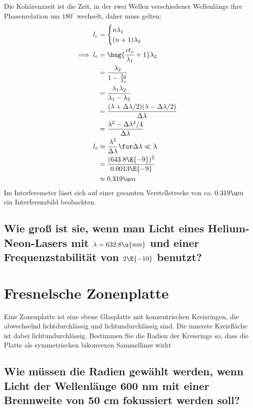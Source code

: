 \documentclass[ex]{exercise}
\begin{document}
\dottedlinett

Die Kohärenzzeit ist die Zeit, in der zwei Wellen verschiedener Wellenlänge ihre 
Phasenrelation um \(180^\circ\) wechselt, daher muss gelten:
\begin{align*}
l_c  &= \begin{cases}
    n \lambda_1\\
    (n+1) \lambda_2\\
\end{cases}\\
\implies l_c &= \hug{\frac{ct_c}{\lambda_1} + 1}\lambda_2\\
 &= \frac{\lambda_2}{1-\frac{\lambda_2}{\lambda_1}}\\
&= \frac{\lambda_1\lambda_2}{\lambda_1-\lambda_2}\\
&= \frac{(\lambda + \Delta\lambda/2)(\lambda - \Delta\lambda/2)}{\Delta\lambda}\\
&= \frac{\lambda^2 - \Delta\lambda^2/4}{\Delta\lambda}\\
l_c &\approx \frac{\lambda^2}{\Delta \lambda}\for \Delta \lambda\ll \lambda\\
 &= \frac{(643.8\E{-9})^2}{0.0013\E{-9}}\\
 &\approx 0.319 \u m
\end{align*}
Im Interferemeter lässt sich auf einer gesamten Verstellstrecke von ca. \(0.319 \u m\)
ein Interferenzbild beobachten.

\subsection{Wie gro{\ss} ist sie, wenn man Licht eines Helium-Neon-Lasers mit 
\(\lambda = 632.8\u{nm}\) und einer Frequenzstabilität von \(2\E{-10}\) benutzt?}

\dottedlinett


\section{Fresnelsche Zonenplatte}
Eine Zonenplatte ist eine ebene Glasplatte mit konzentrischen Kreisringen, die abwechselnd lichtdurchlässig und
lichtundurchlässig sind. Die innerste Kreisfläche ist dabei lichtundurchlässig. 
Bestimmen Sie die Radien der Kreisringe so, dass die Platte als symmetrischen bikonvexen Sammellinse wirkt

\subsection{Wie müssen die Radien gewählt werden, wenn Licht der Wellenlänge 600 nm mit einer Brennweite von 50 cm
fokussiert werden soll?}
\end{document}
